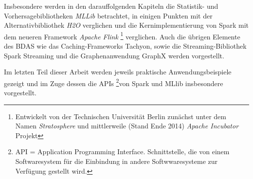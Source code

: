 Insbesondere werden in den darauffolgenden Kapiteln die Statistik- und Vorhersagebibliotheken \textit{MLLib} betrachtet, in einigen Punkten mit der Alternativbibliothek \textit{H2O} verglichen und die Kernimplementierung von Spark mit dem neueren Framework \textit{Apache Flink} \footnote{Entwickelt von der Technischen Universität Berlin zunächst unter dem Namen \textit{Stratosphere} und mittlerweile (Stand Ende 2014) \textit{Apache Incubator} Projekt} verglichen. Auch die übrigen Elemente des BDAS wie das Caching-Frameworks Tachyon, sowie die Streaming-Bibliothek Spark Streaming und die Graphenanwendung GraphX werden vorgestellt. 

Im letzten Teil dieser Arbeit werden jeweils praktische Anwendungsbeispiele gezeigt und im Zuge dessen die APIs \footnote{API = Application Programming Interface. Schnittstelle, die von einem Softwaresystem für die Einbindung in andere Softwwaresysteme zur Verfügung gestellt wird.}von Spark und MLlib insbesondere vorgestellt.   


